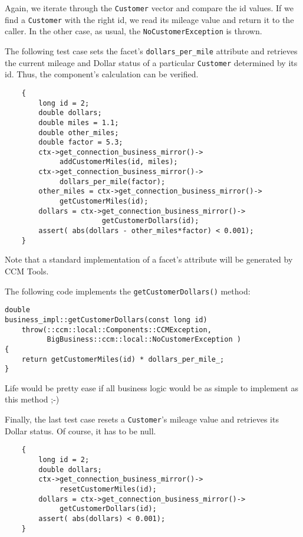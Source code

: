 Again, we iterate through the {\tt Customer} vector and compare the id values.
If we find a {\tt Customer} with the right id, we read its mileage value and
return it to the caller.
In the other case, as usual, the {\tt NoCustomerException} is thrown.


The following test case sets the facet's {\tt dollars\_per\_mile} attribute
and retrieves the current mileage and Dollar status of a particular 
{\tt Customer} determined by its id.
Thus, the component's calculation can be verified.

\begin{small}
\begin{verbatim}
    {
        long id = 2;
        double dollars;
        double miles = 1.1;
        double other_miles;
        double factor = 5.3;
        ctx->get_connection_business_mirror()->
             addCustomerMiles(id, miles); 
        ctx->get_connection_business_mirror()->
             dollars_per_mile(factor);
        other_miles = ctx->get_connection_business_mirror()->
             getCustomerMiles(id);
        dollars = ctx->get_connection_business_mirror()->
                       getCustomerDollars(id); 
        assert( abs(dollars - other_miles*factor) < 0.001);
    }
\end{verbatim}
\end{small}

Note that a standard implementation of a facet's attribute will be
generated by CCM Tools.

The following code implements the {\tt getCustomerDollars()} method:
\begin{small}
\begin{verbatim}
double
business_impl::getCustomerDollars(const long id)
    throw(::ccm::local::Components::CCMException,
          BigBusiness::ccm::local::NoCustomerException )
{
    return getCustomerMiles(id) * dollars_per_mile_;
}
\end{verbatim}
\end{small}

Life would be pretty ease if all business logic would be as simple to implement 
as this method ;-)



Finally, the last test case resets a {\tt Customer}'s mileage value and 
retrieves its Dollar status. Of course, it has to be null.

\begin{small}
\begin{verbatim}
    {
        long id = 2;
        double dollars;
        ctx->get_connection_business_mirror()->
             resetCustomerMiles(id);
        dollars = ctx->get_connection_business_mirror()->
             getCustomerDollars(id); 
        assert( abs(dollars) < 0.001);
    }
\end{verbatim}
\end{small}

